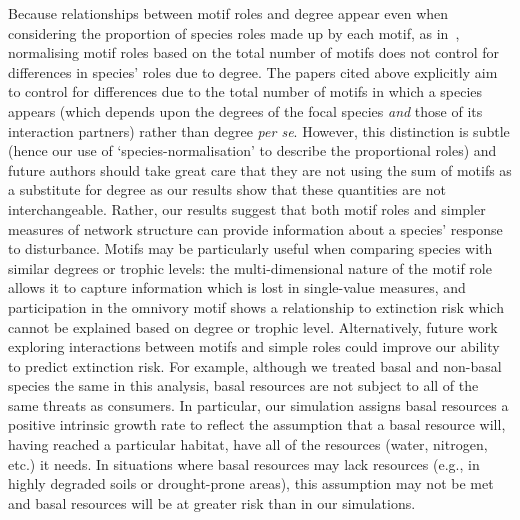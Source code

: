 \documentclass[12pt]{article}
\begin{document}
\begin{spacing}{2.0}
        
	    Because relationships between motif roles and degree appear even when considering the proportion of species roles made up by each motif, as in~\citet{Baker2015,Cirtwill2015,Simmons2019}, normalising motif roles based on the total number of motifs does not control for differences in species' roles due to degree.
	    The papers cited above explicitly aim to control for differences due to the total number of motifs in which a species appears (which depends upon the degrees of the focal species \emph{and} those of its interaction partners) rather than degree \emph{per se}.
	    However, this distinction is subtle (hence our use of `species-normalisation' to describe the proportional roles) and future authors should take great care that they are not using the sum of motifs as a substitute for degree as our results show that these quantities are not interchangeable.
        Rather, our results suggest that both motif roles and simpler measures of network structure can provide information about a species' response to disturbance.
        Motifs may be particularly useful when comparing species with similar degrees or trophic levels: the multi-dimensional nature of the motif role allows it to capture information which is lost in single-value measures, and participation in the omnivory motif shows a relationship to extinction risk which cannot be explained based on degree or trophic level.
        Alternatively, future work exploring interactions between motifs and simple roles could improve our ability to predict extinction risk.
        For example, although we treated basal and non-basal species the same in this analysis, basal resources are not subject to all of the same threats as consumers.
        In particular, our simulation assigns basal resources a positive intrinsic growth rate to reflect the assumption that a basal resource will, having reached a particular habitat, have all of the resources (water, nitrogen, etc.) it needs. 
        In situations where basal resources may lack resources (e.g., in highly degraded soils or drought-prone areas), this assumption may not be met and basal resources will be at greater risk than in our simulations.
        

\end{spacing}
\end{document}
